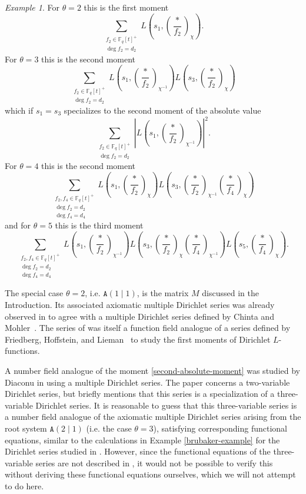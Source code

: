 \documentclass[11pt,letterpaper]{article}
\theoremstyle{definition}
\theoremstyle{remark}
\newtheorem{example}[theorem]{Example}
\numberwithin{equation}{section}
\theoremstyle{dotless}
\begin{document}
\begin{example}
For $\theta=2$ this is the first moment
\[ \sum_{\substack{f_2\in \mathbb F_q[t]^+\\ \deg f_2= d_2}} L \left(s_1, \left( \frac{*}{f_2} \right)_{\chi} \right).\]
For $\theta=3$ this is the second moment
\[ \sum_{\substack{f_2\in \mathbb F_q[t]^+\\ \deg f_2= d_2}} L \left(s_1, \left( \frac{*}{f_2} \right)_{\chi^{-1} } \right)L \left(s_3, \left( \frac{*}{f_2} \right)_{\chi}\right)\] which if $s_1=s_3$ specializes to the second moment of the absolute value 
\begin{equation}\label{second-absolute-moment} \sum_{\substack{f_2\in \mathbb F_q[t]^+\\ \deg f_2= d_2}} \left| L \left(s_1, \left( \frac{*}{f_2} \right)_{\chi^{-1} } \right)\right|^2.\end{equation}
For $\theta=4$ this is the second moment
\[ \sum_{\substack{f_2,f_4\in \mathbb F_q[t]^+\\ \deg f_2= d_2 \\ \deg f_4=d_4 }} L \left(s_1, \left( \frac{*}{f_2} \right)_{\chi } \right)L \left(s_3, \left( \frac{*}{f_2} \right)_{\chi^{-1}}  \left( \frac{*}{f_4} \right)_{\chi} \right)\] and for $\theta=5$ this is the third moment
\[ \sum_{\substack{f_2,f_4\in \mathbb F_q[t]^+\\ \deg f_2= d_2 \\ \deg f_4=d_4 }} L \left(s_1, \left( \frac{*}{f_2} \right)_{\chi^{-1} } \right)L \left(s_3, \left( \frac{*}{f_2} \right)_{\chi}  \left( \frac{*}{f_4} \right)_{\chi^{-1} } \right) L \left( s_5, \left( \frac{*}{f_4} \right)_{\chi}\right).\]

The special case $\theta=2$, i.e. $\mathtt A(1\mid 1)$, is the matrix $M$ discussed in the Introduction. Its associated axiomatic multiple Dirichlet series was already observed in \cite[Proposition 4.1]{s-amds} to agree with a multiple Dirichlet series defined by Chinta and Mohler~\cite{ChintaMohler}. The series of \cite{ChintaMohler} was itself a function field analogue of a series defined by Friedberg, Hoffstein, and Lieman~\cite{FriedbergHoffsteinLieman} to study the first moments of Dirichlet $L$-functions.

A number field analogue of the moment \eqref{second-absolute-moment} was studied by Diaconu in \cite{Diaconu2004} using a multiple Dirichlet series. The paper concerns a two-variable Dirichlet series, but briefly mentions \cite[Remark on p. 677]{Diaconu2004} that this series is a specialization of a three-variable Dirichlet series. It is reasonable to guess that this three-variable series is a number field analogue of the axiomatic multiple Dirichlet series arising from the root system $\mathtt A(2\mid 1)$ (i.e. the case $\theta=3$), satisfying corresponding functional equations, similar to the calculations in Example \ref{brubaker-example} for the Dirichlet series studied in \cite{BrubakerThesis}. However, since the functional equations of the three-variable series are not described in \cite{Diaconu2004}, it would not be possible to verify this without deriving these functional equations ourselves, which we will not attempt to do here. \end{example}
\end{document}
